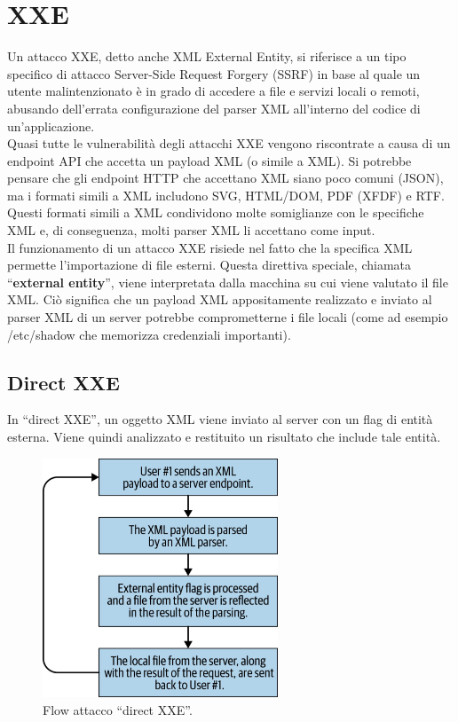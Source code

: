 \chapter{XXE}

Un attacco XXE, detto anche XML External Entity, si riferisce a un tipo specifico di attacco Server-Side Request Forgery (SSRF) in base al quale un utente malintenzionato è in grado di accedere a file e servizi locali o remoti, abusando dell'errata configurazione del parser XML all'interno del codice di un'applicazione.\\ 

Quasi tutte le vulnerabilità degli attacchi XXE vengono riscontrate a causa di un endpoint API che accetta un payload XML (o simile a XML). Si potrebbe pensare che gli endpoint HTTP che accettano XML siano poco comuni (JSON), ma i formati simili a XML includono SVG, HTML/DOM, PDF (XFDF) e RTF. Questi formati simili a XML condividono molte somiglianze con le specifiche XML e, di conseguenza,
molti parser XML li accettano come input.\\

Il funzionamento di un attacco XXE risiede nel fatto che la specifica XML permette l'importazione di file esterni. Questa direttiva speciale, chiamata ``\textbf{external entity}'', viene interpretata dalla macchina su cui viene valutato il file XML. Ciò significa che un payload XML appositamente
realizzato e inviato al parser XML di un server potrebbe
comprometterne i file locali (come ad esempio /etc/shadow che memorizza credenziali importanti).

\newpage

\section{Direct XXE}
In ``direct XXE'', un oggetto XML viene inviato al server con un flag di entità esterna. Viene quindi analizzato e restituito un risultato che include tale entità.

\begin{figure}[H]
	\centering
	\includegraphics[width=7cm, keepaspectratio]{capitoli/web_security/imgs/direct_xxe_flow.png}
	\caption{Flow attacco ``direct XXE''.}
	\label{fig:direct_xxe_flow}
\end{figure}

